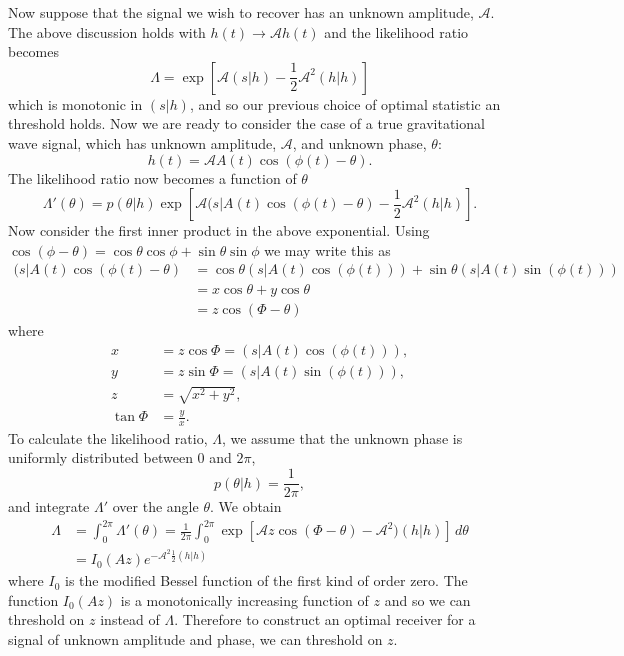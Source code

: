 Now suppose that the signal we wish to recover has an unknown amplitude,
$\mathcal{A}$. The above discussion holds with $h(t) \rightarrow
\mathcal{A}h(t)$ and the likelihood ratio becomes
\begin{equation}
\Lambda = \exp\left[\mathcal{A}(s|h) - \frac{1}{2}\mathcal{A}^2(h|h)\right]
\end{equation}
which is monotonic in $(s|h)$, and so our previous choice of optimal statistic
an threshold holds. Now we are ready to consider the case of a true
gravitational wave signal, which has unknown amplitude, $\mathcal{A}$, and
unknown phase, $\theta$:
\begin{equation}
h(t) = \mathcal{A} A(t) \cos(\phi(t) - \theta).
\end{equation}
The likelihood ratio now becomes a function of $\theta$
\begin{equation}
\Lambda'(\theta) = 
p(\theta|h) \exp\left[\mathcal{A}(s|A(t)\cos(\phi(t) - \theta) -
\frac{1}{2}\mathcal{A}^2(h|h)\right].
\end{equation}
Now consider the first inner product in the above exponential. Using
$\cos(\phi - \theta) = \cos\theta\cos\phi + \sin\theta\sin\phi$ we may write
this as
\begin{equation}
\begin{split}
(s|A(t)\cos(\phi(t) - \theta)  &= 
\cos\theta (s|A(t)\cos(\phi(t))) + \sin\theta (s|A(t)\sin(\phi(t)))  \\
& = x\cos\theta + y\cos\theta \\
& = z\cos(\Phi - \theta)
\end{split}
\end{equation}
where
\begin{align}
x &= z\cos\Phi = (s|A(t)\cos(\phi(t))), \\
y &= z\sin\Phi = (s|A(t)\sin(\phi(t))), \\
z &= \sqrt{x^2 + y^2}, \\
\tan \Phi &= \frac{y}{x}.
\end{align}
To calculate the likelihood ratio, $\Lambda$, we assume that the unknown phase
is uniformly distributed between $0$ and $2\pi$,
\begin{equation}
p(\theta|h) = \frac{1}{2\pi},
\end{equation}
and integrate $\Lambda'$ over the angle $\theta$. We obtain
\begin{equation}
\begin{split}
\Lambda &= \int_0^{2\pi} \Lambda'(\theta) 
= \frac{1}{2\pi}\int_0^{2\pi}\exp\left[\mathcal{A}z\cos(\Phi - \theta) -
\mathcal{A}^2)(h|h)\right] \,d\theta \\
&= I_0(Az) e^{-\mathcal{A}^2\frac{1}{2}(h|h)}
\end{split}
\end{equation}
where $I_0$ is the modified Bessel function of the first kind of order zero.
The function $I_0(Az)$ is a monotonically increasing function of $z$ and so we
can threshold on $z$ instead of $\Lambda$. Therefore to construct an optimal
receiver for a signal of unknown amplitude and phase, we can threshold on $z$.

